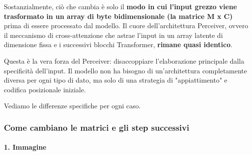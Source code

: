 \documentclass[
  11pt,
]{article}
\begin{document}
Sostanzialmente, ciò che cambia è solo il \textbf{modo in cui
l'input grezzo viene trasformato in un array di byte
bidimensionale (la matrice M x C)} prima di essere processato dal
modello. Il cuore dell'architettura Perceiver, ovvero il
meccanismo di cross-attenzione che astrae l'input in un
array latente di dimensione fissa e i successivi blocchi Transformer,
\textbf{rimane quasi identico}.

Questa è la vera forza del Perceiver: disaccoppiare
l'elaborazione principale dalla specificità
dell'input. Il modello non ha bisogno di
un'architettura completamente diversa per ogni tipo di
dato, ma solo di una strategia di "appiattimento" e codifica posizionale
iniziale.

Vediamo le differenze specifiche per ogni caso.

\subsubsection{\texorpdfstring{\textbf{Come cambiano le matrici e gli
step
successivi}}{Come cambiano le matrici e gli step successivi}}\label{come-cambiano-le-matrici-e-gli-step-successivi}

\paragraph{\texorpdfstring{\textbf{1.
Immagine}}{1. Immagine}}\label{immagine}
\end{document}

